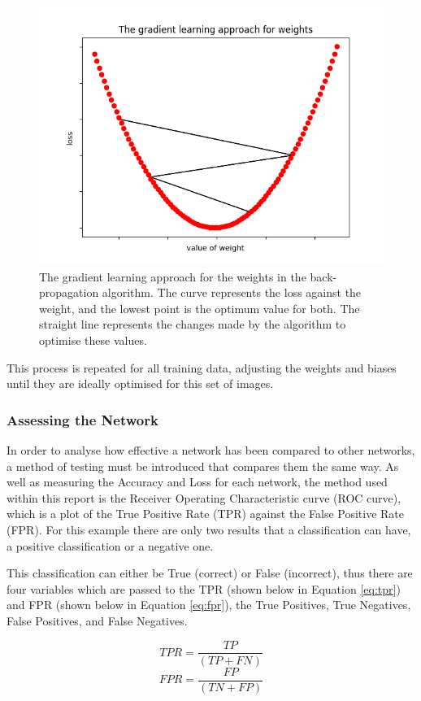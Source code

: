 \documentclass[12pt, onecolumn]{aa}
\begin{document}
\begin{figure}
    \centering
    \includegraphics[width=0.7\linewidth]{Figures/gradient_learning.png}
    \caption{The gradient learning approach for the weights in the back-propagation algorithm. The curve represents the loss against the weight, and the lowest point is the optimum value for both. The straight line represents the changes made by the algorithm to optimise these values.}
    \label{fig:grad_learn}
\end{figure}
    
This process is repeated for all training data, adjusting the weights and biases until they are ideally optimised for this set of images. 

\subsubsection{Assessing the Network}\label{sec:testing}
In order to analyse how effective a network has been compared to other networks, a method of testing must be introduced that compares them the same way. As well as measuring the Accuracy and Loss for each network, the method used within this report is the Receiver Operating Characteristic curve (ROC curve), which is a plot of the True Positive Rate (TPR) against the False Positive Rate (FPR). For this example there are only two results that a classification can have, a positive classification or a negative one. 

This classification can either be True (correct) or False (incorrect), thus there are four variables which are passed to the TPR (shown below in Equation \ref{eq:tpr}) and FPR (shown below in Equation \ref{eq:fpr}), the True Positives, True Negatives, False Positives, and False Negatives. 

\begin{multicols}{2}
\begin{equation}\label{eq:tpr}
   TPR = \frac{TP}{(TP + FN)}
\end{equation}\break
\begin{equation}\label{eq:fpr}
  FPR = \frac{FP}{(TN + FP)}
\end{equation}
\end{multicols}
\end{document}
